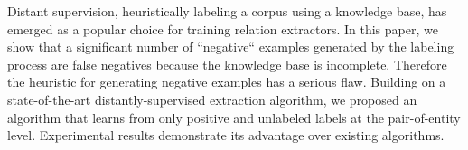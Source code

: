 Distant supervision, heuristically labeling a corpus using a knowledge base, has emerged as a popular choice for training relation extractors. In this
 paper, we show that a significant number of ``negative`` examples generated
 by the labeling process are false negatives because the knowledge base is
 incomplete. Therefore the heuristic for generating negative examples has a
 serious flaw. Building on a state-of-the-art distantly-supervised extraction
 algorithm, we proposed an algorithm that learns from only positive and
 unlabeled labels at the pair-of-entity level. Experimental results demonstrate
 its advantage over existing algorithms.

